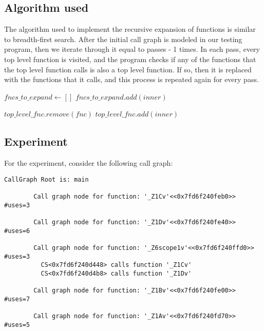 \documentclass{article}
\begin{document}
\begin{enumerate}[(a)]
      \subsection*{Algorithm used}
      The algorithm used to implement the recursive expansion of functions is similar to breadth-first search. After the initial call graph is modeled in our testing program, then we iterate through it equal to passes - 1 times. In each pass, every top level function is visited, and the program checks if any of the functions that the top level function calls is also a top level function. If so, then it is replaced with the functions that it calls, and this process is repeated again for every pass.

      \begin{algorithmic}[1]
            \State $fncs\_to\_expand \gets []$
                \State $fncs\_to\_expand.add(inner)$
              \EndIf
            \EndFor

              \State $top\_level\_fnc.remove(fnc)$
                \State $top\_level\_fnc.add(inner)$
              \EndFor
            \EndFor
          \EndFor
        \EndFor
      \end{algorithmic}

      \subsection*{Experiment}
      For the experiment, consider the following call graph:
      \begin{lstlisting}[basicstyle=\small\ttfamily]
        CallGraph Root is: main

        Call graph node for function: '_Z1Cv'<<0x7fd6f240feb0>>  #uses=3

        Call graph node for function: '_Z1Dv'<<0x7fd6f240fe40>>  #uses=6

        Call graph node for function: '_Z6scope1v'<<0x7fd6f240ffd0>>  #uses=3
          CS<0x7fd6f240d448> calls function '_Z1Cv'
          CS<0x7fd6f240d4b8> calls function '_Z1Dv'

        Call graph node for function: '_Z1Bv'<<0x7fd6f240fe00>>  #uses=7

        Call graph node for function: '_Z1Av'<<0x7fd6f240fd70>>  #uses=5


\end{lstlisting}
\end{enumerate}
\end{document}
